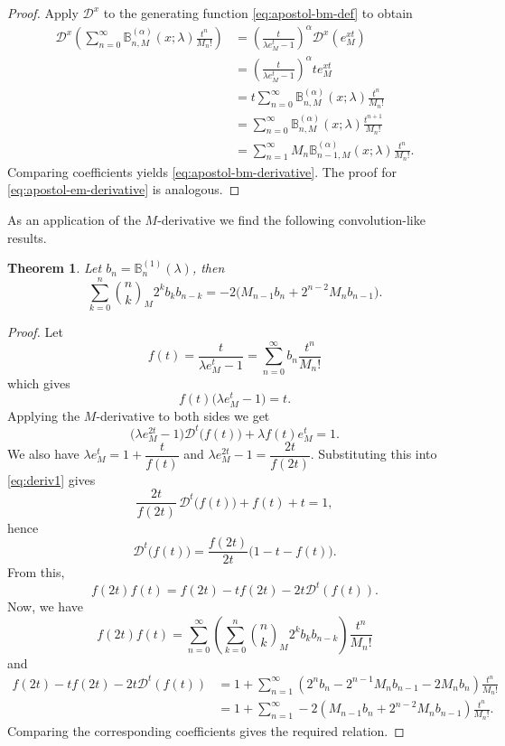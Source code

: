 \documentclass[10pt,a4paper]{amsart}
\newtheorem{theorem}{Theorem}[section]
\numberwithin{equation}{section}
\newcommand{\B}{\mathbb{B}}
\begin{document}
\begin{proof}
Apply $\mathcal{D}^x$ to the generating function \eqref{eq:apostol-bm-def} to obtain
\begin{align*}
\mathcal{D}^x\left(\sum_{n=0}^\infty \B_{n,M}^{(\alpha)}(x;\lambda)\frac{t^n}{M_n!}\right) &= \left(\frac{t}{\lambda e_M^t-1}\right)^\alpha \mathcal{D}^x\left(e_M^{xt}\right) \\
&= \left(\frac{t}{\lambda e_M^t-1}\right)^\alpha t e_M^{xt} \\
&= t\sum_{n=0}^\infty \B_{n,M}^{(\alpha)}(x;\lambda)\frac{t^n}{M_n!} \\
&= \sum_{n=0}^\infty \B_{n,M}^{(\alpha)}(x;\lambda)\frac{t^{n+1}}{M_n!} \\
&= \sum_{n=1}^\infty M_n \B_{n-1,M}^{(\alpha)}(x;\lambda)\frac{t^n}{M_n!}.
\end{align*}
Comparing coefficients yields \eqref{eq:apostol-bm-derivative}. The proof for \eqref{eq:apostol-em-derivative} is analogous.
\end{proof}

As an application of the $M$-derivative we find the following convolution-like results.
\begin{theorem}
Let $b_n = \B_n^{(1)}(\lambda)$, then
\[
\sum_{k=0}^{n}\binom{n}{k}_M 2^k b_k b_{n-k}  = -2\bigl(M_{n-1}b_n+2^{n-2}M_nb_{n-1}\bigr).
\]
\end{theorem}
\begin{proof}
Let
\[
f(t)=\frac{t}{\lambda e_M^t-1}=\sum_{n=0}^\infty b_n\frac{t^n}{M_n!}
\]
which gives
\[
f(t)\bigl(\lambda e_M^t-1\bigr)=t .
\]
Applying the $M$-derivative to both sides we get
\begin{equation}\label{eq:deriv1}
\bigl(\lambda e_M^{2t}-1\bigr)\mathcal D^t\bigl(f(t)\bigr)+\lambda f(t)e_M^t=1.
\end{equation}
We also have $\lambda e_M^t = 1+\dfrac{t}{f(t)}$ and 
$\lambda e_M^{2t}-1 = \dfrac{2t}{f(2t)}.$ Substituting this into \eqref{eq:deriv1} gives
\[
\frac{2t}{f(2t)}\,\mathcal D^t\bigl(f(t)\bigr)+f(t)+t=1,
\]
hence
\begin{equation}\label{eq:deriv2}
\mathcal D^t\bigl(f(t)\bigr)=\frac{f(2t)}{2t}\bigl(1-t-f(t)\bigr).
\end{equation}
From this,
\[
f(2t)f(t) = f(2t)-tf(2t)-2t\mathcal{D}^t(f(t)).
\]
Now, we have 
\[
f(2t)f(t) = \sum_{n=0}^{\infty}\left(\sum_{k=0}^{n}\binom{n}{k}_M 2^k b_k b_{n-k}\right)\frac{t^n}{M_n!}
\]
and
\begin{align*}
f(2t)-tf(2t)-2t\mathcal{D}^t(f(t)) &= 1+\sum_{n=1}^{\infty}\left(2^nb_n-2^{n-1}M_{n}b_{n-1}-2M_nb_n\right)\frac{t^n}{M_n!}\\
&= 1 + \sum_{n=1}^{\infty}-2\left(M_{n-1}b_n+2^{n-2}M_nb_{n-1}\right)\frac{t^n}{M_n!}.
\end{align*}
Comparing the corresponding coefficients gives the required relation.
\end{proof}
\end{document}
